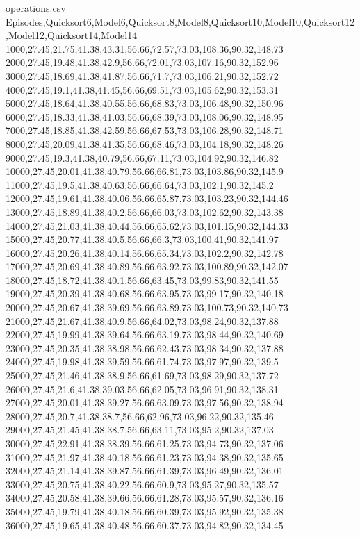 \documentclass[pdflatex,sn-mathphys-num]{sn-jnl}%
\theoremstyle{thmstyleone}%
\theoremstyle{thmstyletwo}%
\theoremstyle{thmstylethree}%
\begin{document}
\begin{filecontents*}{operations.csv}
Episodes,Quicksort6,Model6,Quicksort8,Model8,Quicksort10,Model10,Quicksort12,Model12,Quicksort14,Model14
1000,27.45,21.75,41.38,43.31,56.66,72.57,73.03,108.36,90.32,148.73
2000,27.45,19.48,41.38,42.9,56.66,72.01,73.03,107.16,90.32,152.96
3000,27.45,18.69,41.38,41.87,56.66,71.7,73.03,106.21,90.32,152.72
4000,27.45,19.1,41.38,41.45,56.66,69.51,73.03,105.62,90.32,153.31
5000,27.45,18.64,41.38,40.55,56.66,68.83,73.03,106.48,90.32,150.96
6000,27.45,18.33,41.38,41.03,56.66,68.39,73.03,108.06,90.32,148.95
7000,27.45,18.85,41.38,42.59,56.66,67.53,73.03,106.28,90.32,148.71
8000,27.45,20.09,41.38,41.35,56.66,68.46,73.03,104.18,90.32,148.26
9000,27.45,19.3,41.38,40.79,56.66,67.11,73.03,104.92,90.32,146.82
10000,27.45,20.01,41.38,40.79,56.66,66.81,73.03,103.86,90.32,145.9
11000,27.45,19.5,41.38,40.63,56.66,66.64,73.03,102.1,90.32,145.2
12000,27.45,19.61,41.38,40.06,56.66,65.87,73.03,103.23,90.32,144.46
13000,27.45,18.89,41.38,40.2,56.66,66.03,73.03,102.62,90.32,143.38
14000,27.45,21.03,41.38,40.44,56.66,65.62,73.03,101.15,90.32,144.33
15000,27.45,20.77,41.38,40.5,56.66,66.3,73.03,100.41,90.32,141.97
16000,27.45,20.26,41.38,40.14,56.66,65.34,73.03,102.2,90.32,142.78
17000,27.45,20.69,41.38,40.89,56.66,63.92,73.03,100.89,90.32,142.07
18000,27.45,18.72,41.38,40.1,56.66,63.45,73.03,99.83,90.32,141.55
19000,27.45,20.39,41.38,40.68,56.66,63.95,73.03,99.17,90.32,140.18
20000,27.45,20.67,41.38,39.69,56.66,63.89,73.03,100.73,90.32,140.73
21000,27.45,21.67,41.38,40.9,56.66,64.02,73.03,98.24,90.32,137.88
22000,27.45,19.99,41.38,39.64,56.66,63.19,73.03,98.44,90.32,140.69
23000,27.45,20.35,41.38,38.98,56.66,62.43,73.03,98.34,90.32,137.88
24000,27.45,19.98,41.38,39.59,56.66,61.74,73.03,97.97,90.32,139.5
25000,27.45,21.46,41.38,38.9,56.66,61.69,73.03,98.29,90.32,137.72
26000,27.45,21.6,41.38,39.03,56.66,62.05,73.03,96.91,90.32,138.31
27000,27.45,20.01,41.38,39.27,56.66,63.09,73.03,97.56,90.32,138.94
28000,27.45,20.7,41.38,38.7,56.66,62.96,73.03,96.22,90.32,135.46
29000,27.45,21.45,41.38,38.7,56.66,63.11,73.03,95.2,90.32,137.03
30000,27.45,22.91,41.38,38.39,56.66,61.25,73.03,94.73,90.32,137.06
31000,27.45,21.97,41.38,40.18,56.66,61.23,73.03,94.38,90.32,135.65
32000,27.45,21.14,41.38,39.87,56.66,61.39,73.03,96.49,90.32,136.01
33000,27.45,20.75,41.38,40.22,56.66,60.9,73.03,95.27,90.32,135.57
34000,27.45,20.58,41.38,39.66,56.66,61.28,73.03,95.57,90.32,136.16
35000,27.45,19.79,41.38,40.18,56.66,60.39,73.03,95.92,90.32,135.38
36000,27.45,19.65,41.38,40.48,56.66,60.37,73.03,94.82,90.32,134.45

\end{filecontents*}
\end{document}
